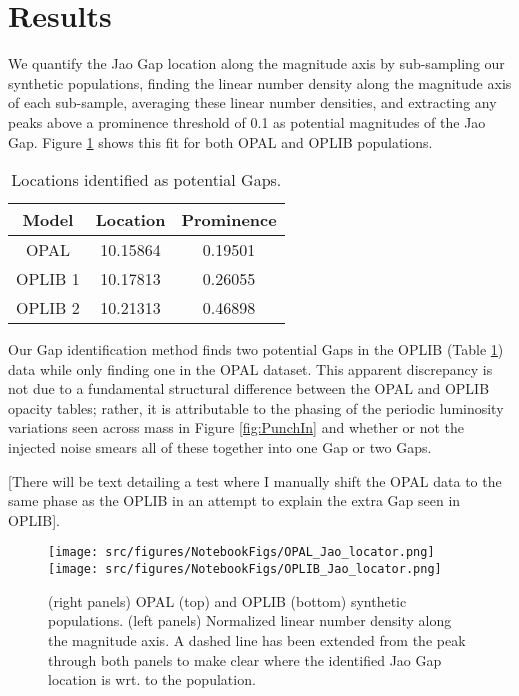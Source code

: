 \section{Results}\label{sec:results}
We quantify the Jao Gap location along the magnitude axis by sub-sampling our
synthetic populations, finding the linear number density along the magnitude
axis of each sub-sample, averaging these linear number densities, and
extracting any peaks above a prominence threshold of 0.1 as potential
magnitudes of the Jao Gap. Figure \ref{fig:JaoGapLocator} shows this fit for
both OPAL and OPLIB populations.

\begin{table}
	\centering
	\begin{tabular}{c | c c}
		\hline
		Model & Location & Prominence \\
		\hline
		\hline
		OPAL & 10.15864 & 0.19501 \\
		OPLIB 1 & 10.17813 & 0.26055 \\
		OPLIB 2 & 10.21313 & 0.46898
	\end{tabular}
	\caption{Locations identified as potential Gaps.}
	\label{tab:GapLocation}
\end{table}

Our Gap identification method finds two potential Gaps in the OPLIB (Table
\ref{tab:GapLocation}) data while only finding one in the OPAL dataset. This
apparent discrepancy is not due to a fundamental structural difference between
the OPAL and OPLIB opacity tables; rather, it is attributable to the
phasing of the periodic luminosity variations seen across mass in Figure
\ref{fig:PunchIn} and whether or not the
injected noise smears all of these together into one Gap or two Gaps.

{\color{red} [There will be text detailing a test where I manually shift the
OPAL data to the same phase as the OPLIB in an attempt to explain the extra Gap
seen in OPLIB]}.

\begin{figure}
	\centering
	\texttt{[image: src/figures/NotebookFigs/OPAL\_Jao\_locator.png]}
	\texttt{[image: src/figures/NotebookFigs/OPLIB\_Jao\_locator.png]}
	\caption{(right panels) OPAL (top) and OPLIB (bottom) synthetic
	populations. (left panels) Normalized linear number density along the
	magnitude axis. A dashed line has been extended from the peak through both
	panels to make clear where the identified Jao Gap location is wrt. to the
	population. }
	\label{fig:JaoGapLocator}
\end{figure}

